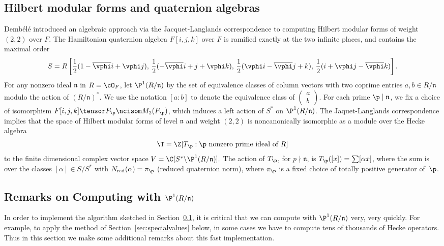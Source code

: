\documentclass{amsart}
\newcommand{\n}{\mathfrak{n}}
\newcommand{\dembele}{Demb\'el{\'e}\xspace}
\begin{document}
\subsection{Hilbert modular forms and quaternion 
algebras}\label{sec:dembele}
\dembele \cite{dembele:hilbert5} introduced an algebraic approach via
the Jacquet-Langlands correspondence to computing Hilbert modular
forms of weight $(2,2)$ over $F$.  The Hamiltonian quaternion algebra
$F[i,j,k]$ over $F$ is ramified exactly at the two infinite places,
and contains the maximal order
$$
 S = R\left[\frac{1}{2}(1-\overline{\vphi} i + \vphi j),\,
       \frac{1}{2}(-\overline{\vphi} i + j + \vphi k),\,
       \frac{1}{2}(\vphi i - \overline{\vphi} j + k), \,
       \frac{1}{2}(i + \vphi j - \overline{\vphi} k)\right].
$$
For any nonzero ideal $\n$ in $R=\cO_F$,
let $\P^1(R/\n)$ by the set of equivalence classes of
 column vectors with two coprime entries $a,b \in R/\n$ modulo the
 action of $(R/\n)^*$.  We use the notation $[a:b]$
to denote the equivalence class of 
$\left(\begin{smallmatrix}a\\b\end{smallmatrix}\right)$.
For each prime $\p\mid \n$, we fix a choice of isomorphism
$F[i,j,k]\tensor F_{\p} \ncisom M_2(F_{\p})$, which induces a left
action of $S^*$ on $\P^1(R/\n)$. The Jaquet-Langlands correspondence implies that
the space of Hilbert modular forms of level $\n$ and weight $(2,2)$ is
noncanonically isomorphic as a module over the Hecke algebra
$$\T=\Z[T_\p :  \p \text{ nonzero prime ideal of }R]$$ 
to the finite dimensional complex vector space $ V = \C[S^* \backslash
\P^1(R/\n)].  $ The action of $T_{\p}$, for $p\nmid \n$, is
$T_{\p}([x]) = \sum [\alpha x]$, where the sum is over the classes
$[\alpha]\in S/S^*$ with $N_{\text{red}}(\alpha)=\pi_{\p}$ (reduced quaternion norm),
where $\pi_{\p}$ is a fixed choice of totally positive generator of~$\p$.

\subsection{Remarks on Computing with $\P^1(R/\n)$}\label{sec:p1rn}

In order to implement the algorithm sketched in
Section~\ref{sec:dembele}, it is critical that we can compute with
$\P^1(R/\n)$ very, very quickly.  For example, to apply the method of
Section~\ref{sec:specialvalues} below, in some cases we have to
compute tens of thousands of Hecke operators.  Thus in this section we
make some additional remarks about this fast
implementation.
\end{document}
